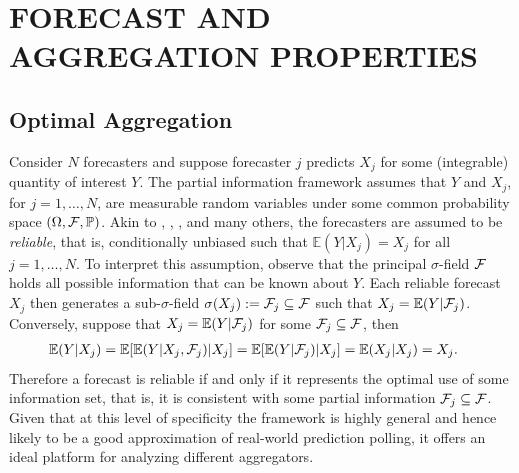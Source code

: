 \documentclass[12pt]{article}
\renewcommand{\P}{\mathbb{P}}
\newcommand{\E}{\mathbb{E}}
\theoremstyle{definition}
\theoremstyle{definition}
\def\F{{\cal F}}
\def\P{{\mathbb P}}
\def\E{{\mathbb E}}
\begin{document}
\section{FORECAST AND AGGREGATION PROPERTIES} \label{propertiesS}
\subsection{Optimal Aggregation}


Consider $N$ forecasters and suppose forecaster $j$ predicts $X_j$ for
some (integrable) quantity of interest $Y$.  The partial information
framework assumes that $Y$ and $X_j$, for $j = 1, \dots, N$, are
measurable random variables under some common probability space
$(\Omega, \F , \P)$.
Akin to \cite{murphy1987general}, \cite{Ranjan08}, \cite{jolliffe2012forecast}, and many others, 
 the forecasters are assumed to be \textit{reliable}, that is, conditionally unbiased
such that $\E(Y | X_j) = X_j$ for all $j = 1, \dots, N$.  To interpret
this assumption, observe that the principal $\sigma$-field $\F$ holds
all possible information that can be known about $Y$. Each
reliable forecast $X_j$ then generates a sub-$\sigma$-field
$\sigma(X_j) := \F_j \subseteq \F$ such that $X_j
= \E(Y|\F_j)$. Conversely, suppose that $X_j = \E(Y|\F_j)$ for some
$\F_j \subseteq \F$, then
\begin{align*}
\E(Y | X_j) &= \E[\E(Y|X_j,\F_j)|X_j] = \E[\E(Y|\F_j)|X_j] = \E(X_j|X_j) = X_j.
\end{align*}
Therefore a forecast is reliable if and only if it represents the optimal use of some information set, that is, it is consistent with some partial information $\F_j \subseteq \F$. Given that at this level of specificity the framework is highly general and hence likely to be a good approximation of real-world prediction polling, it offers an ideal platform for analyzing different aggregators. 
\end{document}

